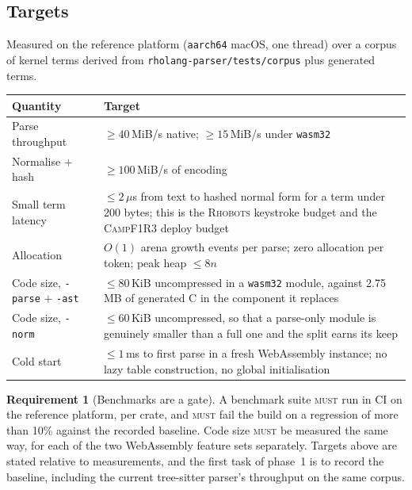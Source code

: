 \documentclass[11pt,a4paper]{article}
\newcommand{\code}[1]{\texttt{#1}}
\newcommand{\Camp}{\textsc{CampF1R3}}
\newcommand{\Rhobots}{\textsc{Rhobots}}
\newcommand{\MUST}{\textsc{must}}
\theoremstyle{definition}
\newtheorem{requirement}[definition]{Requirement}
\theoremstyle{plain}
\begin{document}
\subsection{Targets}

Measured on the reference platform (\code{aarch64} macOS, one thread) over a
corpus of kernel terms derived from \code{rholang-parser/tests/corpus} plus
generated terms.

\begin{center}
\begin{tabularx}{\linewidth}{@{}l>{\raggedright\arraybackslash}X@{}}
\toprule
Quantity & Target\\
\midrule
Parse throughput & $\ge 40$\,MiB/s native; $\ge 15$\,MiB/s under \code{wasm32}\\
Normalise $+$ hash & $\ge 100$\,MiB/s of encoding\\
Small term latency & $\le 2\,\mu$s from text to hashed normal form for a term
under 200 bytes; this is the \Rhobots{} keystroke budget and the \Camp{} deploy
budget\\
Allocation & $O(1)$ arena growth events per parse; zero allocation per token;
peak heap $\le 8n$\\
Code size, \code{-parse} $+$ \code{-ast} & $\le 80$\,KiB uncompressed in a
\code{wasm32} module, against 2.75\,MB of generated C in the component it
replaces\\
Code size, \code{-norm} & $\le 60$\,KiB uncompressed, so that a parse-only
module is genuinely smaller than a full one and the split earns its keep\\
Cold start & $\le 1$\,ms to first parse in a fresh WebAssembly instance; no lazy
table construction, no global initialisation\\
\bottomrule
\end{tabularx}
\end{center}

\begin{requirement}[Benchmarks are a gate]
A benchmark suite \MUST{} run in CI on the reference platform, per crate, and
\MUST{} fail the build on a regression of more than 10\% against the recorded
baseline. Code size \MUST{} be measured the same way, for each of the two
WebAssembly feature sets separately. Targets above are stated relative to
measurements, and the first task of phase~1 is to record the baseline, including
the current tree-sitter parser's throughput on the same corpus.
\end{requirement}
\end{document}
